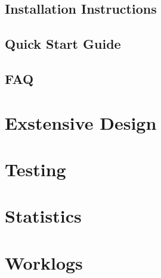 \documentclass[10pt]{report}
\begin{document}
\section{Installation Instructions}

\section{Quick Start Guide}

\section{FAQ}

\chapter{Exstensive Design}

\chapter{Testing}

\chapter{Statistics}

\chapter{Worklogs}
\end{document}
